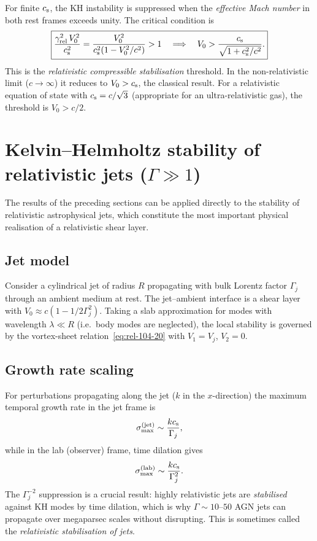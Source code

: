 For finite $c_{\mathrm{s}}$, the KH instability is suppressed when the
\emph{effective Mach number} in both rest frames exceeds unity.  The
critical condition is
\begin{equation}
\label{eq:rel-104-24}
\boxed{\frac{\gamma_{\mathrm{rel}}^2\,V_0^2}{c_{\mathrm{s}}^2}
  = \frac{V_0^2}{c_{\mathrm{s}}^2(1-V_0^2/c^2)} > 1
  \quad\Longrightarrow\quad
  V_0 > \frac{c_{\mathrm{s}}}{\sqrt{1+c_{\mathrm{s}}^2/c^2}}.}
\end{equation}
This is the \emph{relativistic compressible stabilisation} threshold.
In the non-relativistic limit ($c\to\infty$) it reduces to $V_0>c_{\mathrm{s}}$,
the classical result.  For a relativistic equation of state with
$c_{\mathrm{s}}=c/\sqrt{3}$ (appropriate for an ultra-relativistic gas), the
threshold is $V_0 > c/2$.

\section{Kelvin--Helmholtz stability of relativistic jets ($\Gamma\gg 1$)}
\label{sec:rel-11-104-jets}

The results of the preceding sections can be applied directly to the
stability of relativistic astrophysical jets, which constitute the
most important physical realisation of a relativistic shear layer.

\subsection{Jet model}
\label{sec:rel-11-104-jets-model}

Consider a cylindrical jet of radius $R$ propagating with bulk
Lorentz factor $\Gamma_j$ through an ambient medium at rest.  The
jet--ambient interface is a shear layer with $V_0\approx c(1-1/2\Gamma_j^2)$.
Taking a slab approximation for modes with wavelength $\lambda\ll R$
(i.e.\ body modes are neglected), the local stability is governed by
the vortex-sheet relation~\eqref{eq:rel-104-20} with
$V_1=V_j$, $V_2=0$.

\subsection{Growth rate scaling}
\label{sec:rel-11-104-jets-growth}

For perturbations propagating along the jet ($k$ in the $x$-direction)
the maximum temporal growth rate in the jet frame is
\begin{equation}
\label{eq:rel-104-25}
\sigma_{\max}^{\mathrm{(jet)}} \sim \frac{kc_{\mathrm{s}}}{\Gamma_j},
\end{equation}
while in the lab (observer) frame, time dilation gives
\begin{equation}
\label{eq:rel-104-26}
\sigma_{\max}^{\mathrm{(lab)}} \sim \frac{kc_{\mathrm{s}}}{\Gamma_j^2}.
\end{equation}
The $\Gamma_j^{-2}$ suppression is a crucial result: highly
relativistic jets are \emph{stabilised} against KH modes by time
dilation, which is why $\Gamma\sim 10$--$50$ AGN jets can propagate
over megaparsec scales without disrupting.  This is sometimes called
the \emph{relativistic stabilisation of jets}.

